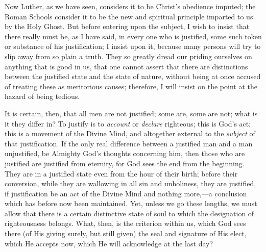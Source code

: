 Now Luther, as we have seen, considers it to be Christ's obedience
imputed; the Roman Schools consider it to be the new and spiritual
principle imparted to us by the Holy Ghost. But before entering upon
the subject, I wish to insist that there really must be, as I have
said, in every one who is justified, some such token or substance of
his justification; I insist upon it, because many persons will try to
slip away from so plain a truth. They so greatly dread our priding
ourselves on anything that is good in us, that one cannot assert that
there are distinctions between the justified state and the state
of nature, without being at once accused of treating these as
meritorious causes; therefore, I will insist on the point at the
hazard of being tedious.

It is certain, then, that all men are not justified; some are, some
are not; what is it they differ in? To justify is to \emph{account} or
\emph{declare} righteous; this is God's act; this is a movement of the
Divine Mind, and altogether external to the \emph{subject} of that
justification. If the only real difference between a justified man and
a man unjustified, be Almighty God's thoughts concerning him, then
those who are justified are justified from eternity, for God sees the
end from the beginning. They are in a justified state even from the
hour of their birth; before their conversion, while they are wallowing
in all sin and unholiness, they are justified, if justification be an
act of the Divine Mind and nothing more,—a conclusion which has
before now been maintained. Yet, unless we go these lengths, we must
allow that there is a certain distinctive state of soul to which the
designation of righteousness belongs. What, then, is the criterion
within us, which God sees there (of His giving surely, but still
given) the seal and signature of His elect, which He accepts now,
which He will acknowledge at the last day?

